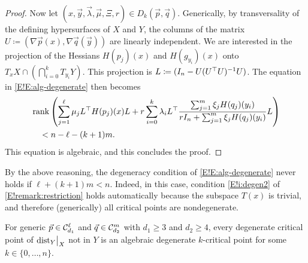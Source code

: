 \begin{proof}
  Now let $(x, \vec{y}, \vec{\lambda}, \vec{\mu}, \Xi, r) \in D_k(\vec{p}, \vec{q})$. Generically, by transversality of the defining hypersurfaces of $X$ and $Y$, the columns of the matrix $U \coloneq (\nabla \vec{p}(x), \nabla\vec{q}(\vec{y}))$ are linearly independent. We are interested in the projection of the Hessians $H(p_j)(x)$ and $H(g_{y_i})(x)$ onto $T_x X \cap (\bigcap_{i = 0}^k T_{y_i} Y)$. This projection is $L \coloneq (I_n - U (U^\top U)^{-1} U)$. The equation in \eqref{E!E:alg-degenerate} then becomes
  \begin{align*}
    & \operatorname{rank} \left( \sum_{j = 1}^\ell \mu_j L^\top H(p_j)(x) L + r \sum_{i = 0}^k \lambda_i L^\top \frac{\sum_{j = 1}^m \xi_j H(q_j)(y_i)}{r I_n + \sum_{j = 1}^m \xi_j H(q_j)(y_i)} L \right) \\
    & \quad < n - \ell - (k + 1) m.
  \end{align*}
  This equation is algebraic, and this concludes the proof.
\end{proof}

\begin{remark}
\label{E!R:trivial-nondegeneracy}
  By the above reasoning, the degeneracy condition of \eqref{E!E:alg-degenerate} never holds if $\ell + (k + 1) m < n$. Indeed, in this case, condition \ref{E!i:degen2} of \cref{E!remark:restriction} holds automatically because the subspace $T(x)$ is trivial, and therefore (generically) all critical points are nondegenerate.
\end{remark}

\begin{lemma}
\label{E!L:deg-is-alg-deg}
  For generic $\vec{p} \in \mathcal{C}_{d_1}^\ell$ and $\vec{q} \in \mathcal{C}_{d_2}^m$ with $d_1 \geq 3$ and $d_2 \geq 4$, every degenerate critical point of $\mathord{\operatorname{dist}}_Y\big|_X$ not in $Y$ is an algebraic degenerate $k$-critical point for some $k \in \{0, \ldots, n\}$.
\end{lemma}

